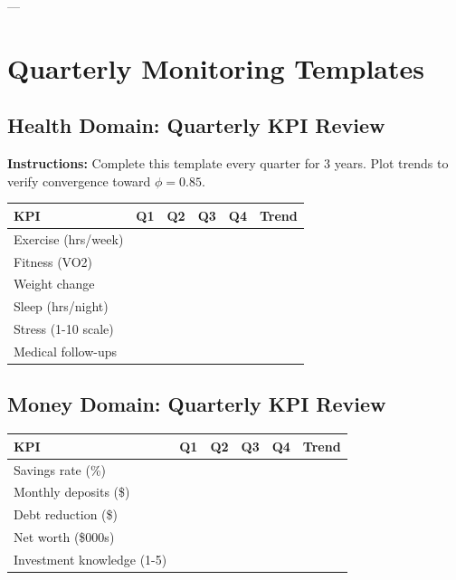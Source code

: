 ---


\section{Quarterly Monitoring Templates}
\label{rrr:monitoring}

\subsection{Health Domain: Quarterly KPI Review}

\textbf{Instructions:} Complete this template every quarter for 3 years. Plot trends to verify convergence toward $\phi = 0.85$.

\begin{center}
\tiny
\begin{tabular}{@{}p{2cm}|cccc|c@{}}
\toprule
\textbf{KPI} & \textbf{Q1} & \textbf{Q2} & \textbf{Q3} & \textbf{Q4} & \textbf{Trend} \\
\midrule
Exercise (hrs/week) & & & & & \\
Fitness (VO2) & & & & & \\
Weight change & & & & & \\
Sleep (hrs/night) & & & & & \\
Stress (1-10 scale) & & & & & \\
Medical follow-ups & & & & & \\
\midrule
\end{tabular}
\end{center}

\subsection{Money Domain: Quarterly KPI Review}

\begin{center}
\tiny
\begin{tabular}{@{}p{2cm}|cccc|c@{}}
\toprule
\textbf{KPI} & \textbf{Q1} & \textbf{Q2} & \textbf{Q3} & \textbf{Q4} & \textbf{Trend} \\
\midrule
Savings rate (\%) & & & & & \\
Monthly deposits (\$) & & & & & \\
Debt reduction (\$) & & & & & \\
Net worth (\$000s) & & & & & \\
Investment knowledge (1-5) & & & & & \\
\midrule
\end{tabular}
\end{center}

